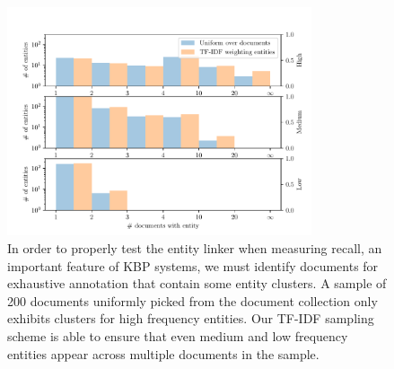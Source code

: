 \begin{figure}
  \centering
  \includegraphics[width=0.8\textwidth]{figures/analysis/exhaustive_entity_cross}
  \caption[Comparison of document sampling distributions]{\label{fig:kbpo:exhaustive_entity_cross}
  In order to properly test the entity linker when measuring recall, an important feature of KBP systems, we must identify documents for exhaustive annotation that contain some entity clusters.
  A sample of 200 documents uniformly picked from the document collection only exhibits clusters for high frequency entities.
  Our TF-IDF sampling scheme is able to ensure that even medium and low frequency entities appear across multiple documents in the sample.
  }
\end{figure}

